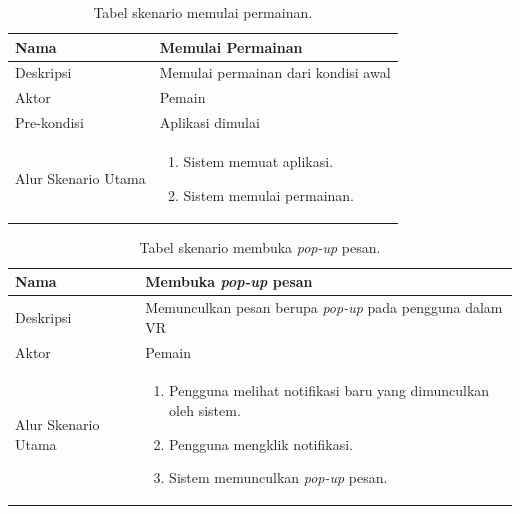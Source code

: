 \begin{table}[]
    \centering
    \begin{tabular}{|p{3cm}|p{10cm}|}
    \hline
        Nama & Memulai Permainan\\
    \hline
    \hline
        Deskripsi & Memulai permainan dari kondisi awal\\
    \hline
        Aktor & Pemain \\
    \hline
        Pre-kondisi & Aplikasi dimulai \\
    \hline
        Alur Skenario Utama & 
        \begin{enumerate}
            \item Sistem memuat aplikasi.
            \item Sistem memulai permainan.
        \end{enumerate}\\
    \hline
    \end{tabular}
    \caption{Tabel skenario memulai permainan.}
    \label{tab:tabel_skenario_memulai_permainan}
\end{table}


\begin{table}[]
    \centering
    \begin{tabular}{|p{3cm}|p{10cm}|}
    \hline
        Nama & Membuka \textit{pop-up} pesan\\
    \hline
    \hline
        Deskripsi & Memunculkan pesan berupa \textit{pop-up} pada pengguna dalam VR\\
    \hline
        Aktor & Pemain \\
    \hline
        Alur Skenario Utama & 
        \begin{enumerate}
            \item Pengguna melihat notifikasi baru yang dimunculkan oleh sistem.
            \item Pengguna mengklik notifikasi.
            \item Sistem memunculkan \textit{pop-up} pesan.
        \end{enumerate}\\
    \hline
    \end{tabular}
    \caption{Tabel skenario membuka \textit{pop-up} pesan.}
    \label{tab:tabel_skenario_membuka_pop-up_pesan}
\end{table}


